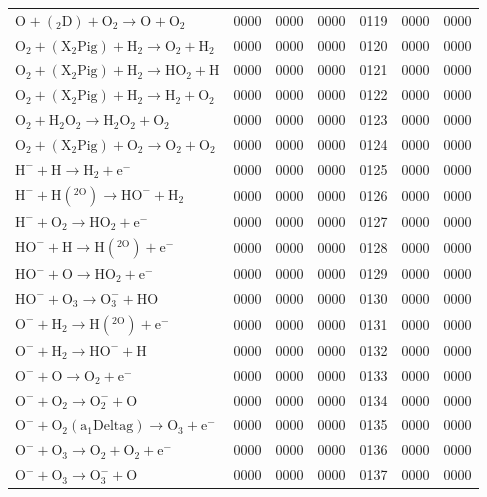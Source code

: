 \begin{longtable}{lrrrrrr}
$\mathrm{O^{} + (_2D) + O_2 \rightarrow O^{} + O_2}$ & 0000 & 0000 & 0000 & 0119 & 0000 & 0000 \\
$\mathrm{O_2^{} + (X_2Pig) + H_2 \rightarrow O_2^{} + H_2}$ & 0000 & 0000 & 0000 & 0120 & 0000 & 0000 \\
$\mathrm{O_2^{} + (X_2Pig) + H_2 \rightarrow HO_2^{} + H}$ & 0000 & 0000 & 0000 & 0121 & 0000 & 0000 \\
$\mathrm{O_2^{} + (X_2Pig) + H_2 \rightarrow H_2^{} + O_2}$ & 0000 & 0000 & 0000 & 0122 & 0000 & 0000 \\
$\mathrm{O_2^{} + H_2O_2 \rightarrow H_2O_2^{} + O_2}$ & 0000 & 0000 & 0000 & 0123 & 0000 & 0000 \\
$\mathrm{O_2^{} + (X_2Pig) + O_2 \rightarrow O_2^{} + O_2}$ & 0000 & 0000 & 0000 & 0124 & 0000 & 0000 \\
$\mathrm{H^{-} + H \rightarrow H_2 + e^{-}}$ & 0000 & 0000 & 0000 & 0125 & 0000 & 0000 \\
$\mathrm{H^{-} + H(^{2O}) \rightarrow HO^{-} + H_2}$ & 0000 & 0000 & 0000 & 0126 & 0000 & 0000 \\
$\mathrm{H^{-} + O_2 \rightarrow HO_2 + e^{-}}$ & 0000 & 0000 & 0000 & 0127 & 0000 & 0000 \\
$\mathrm{HO^{-} + H \rightarrow H(^{2O}) + e^{-}}$ & 0000 & 0000 & 0000 & 0128 & 0000 & 0000 \\
$\mathrm{HO^{-} + O \rightarrow HO_2 + e^{-}}$ & 0000 & 0000 & 0000 & 0129 & 0000 & 0000 \\
$\mathrm{HO^{-} + O_3 \rightarrow O_3^{-} + HO}$ & 0000 & 0000 & 0000 & 0130 & 0000 & 0000 \\
$\mathrm{O^{-} + H_2 \rightarrow H(^{2O}) + e^{-}}$ & 0000 & 0000 & 0000 & 0131 & 0000 & 0000 \\
$\mathrm{O^{-} + H_2 \rightarrow HO^{-} + H}$ & 0000 & 0000 & 0000 & 0132 & 0000 & 0000 \\
$\mathrm{O^{-} + O \rightarrow O_2 + e^{-}}$ & 0000 & 0000 & 0000 & 0133 & 0000 & 0000 \\
$\mathrm{O^{-} + O_2 \rightarrow O_2^{-} + O}$ & 0000 & 0000 & 0000 & 0134 & 0000 & 0000 \\
$\mathrm{O^{-} + O_2(a_1Deltag) \rightarrow O_3 + e^{-}}$ & 0000 & 0000 & 0000 & 0135 & 0000 & 0000 \\
$\mathrm{O^{-} + O_3 \rightarrow O_2 + O_2 + e^{-}}$ & 0000 & 0000 & 0000 & 0136 & 0000 & 0000 \\
$\mathrm{O^{-} + O_3 \rightarrow O_3^{-} + O}$ & 0000 & 0000 & 0000 & 0137 & 0000 & 0000 \\

\end{longtable}
